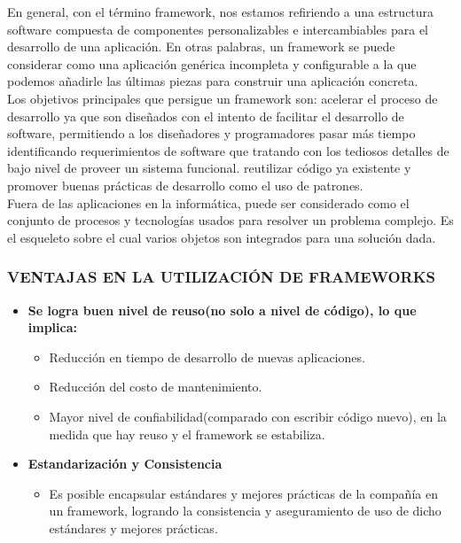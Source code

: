 En general, con el término framework, nos estamos refiriendo a una estructura
software compuesta de componentes personalizables e intercambiables para el
desarrollo de una aplicación. En otras palabras, un framework se puede considerar como
una aplicación genérica incompleta y configurable a la que podemos añadirle las últimas
piezas para construir una aplicación concreta.\\

Los objetivos principales que persigue un framework son: 
acelerar el proceso de desarrollo ya que son diseñados con el intento de facilitar el desarrollo de software, permitiendo a los diseñadores y programadores pasar más tiempo identificando requerimientos de software que tratando con los tediosos detalles de bajo nivel de proveer un sistema funcional.
reutilizar código ya existente y promover buenas prácticas de desarrollo como el uso de patrones.\\

Fuera de las aplicaciones en la informática, puede ser considerado como el conjunto de procesos y tecnologías usados para resolver un problema complejo. Es el esqueleto sobre el cual varios objetos son integrados para una solución dada.

\subsubsection{VENTAJAS EN LA UTILIZACIÓN DE FRAMEWORKS}

\begin{itemize}
  \item \textbf{Se logra buen nivel de reuso(no solo a nivel de código), lo que implica:}
    \begin{itemize}
      \item Reducción en tiempo de desarrollo de nuevas aplicaciones.
      \item Reducción del costo de mantenimiento.
      \item Mayor nivel de confiabilidad(comparado con escribir código nuevo), en la medida que hay reuso y el framework se estabiliza.
    \end{itemize}
  \item \textbf{Estandarización y Consistencia}
    \begin{itemize}
      \item Es posible encapsular estándares y mejores prácticas de la compañía en un framework, logrando la consistencia y aseguramiento de uso de dicho estándares y mejores prácticas.
    \end{itemize}
\end{itemize}

